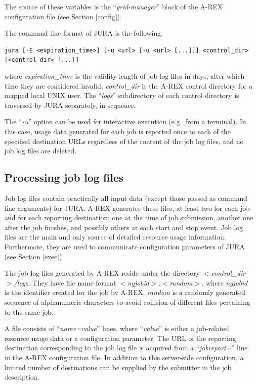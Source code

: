\documentclass{article}                            %
\begin{document}
The source of these variables is the ``\textit{grid-manager}'' block
of the A-REX configuration file (see Section \ref{config}).

The command line format of JURA is the following: %

\verb|jura [-E <expiration_time>] [-u <url> [-u <url> [...]]] <control_dir> [<control_dir> [...]]|

where \textit{expiration\_time} is the validity length of job log
files in days, after which time they are considered invalid;
\textit{control\_dir} is the A-REX control directory for a mapped
local UNIX user. The ``\textit{logs}'' subdirectory of each control
directory is traversed by JURA separately, in sequence.

The ``\textit{-u}'' option can be used for interactive execution
(e.g.~from a terminal). In this case, usage data generated for each
job is reported once to each of the specified destination URLs
regardless of the content of the job log files, and no job log files
are deleted.

\subsection{Processing job log files}
\label{joblogs}

Job log files contain practically all input data (except those passed
as command line arguments) for JURA. A-REX generates these files, at
least two for each job and for each reporting destination: one at the
time of job submission, another one after the job finishes, and
possibly others at each start and stop event. Job log files are the
main and only source of detailed resource usage information.
Furthermore, they are used to communicate configuration parameters of
JURA (see Section \ref{exec}).

The job log files generated by A-REX reside under the directory
\textit{$<$control\_dir$>$/logs}\cite{arex}. They have file name format
\textit{$<$ngjobid$>$.$<$random$>$}, where \textit{ngjobid} is the
identifier created for the job by A-REX, \textit{random} is a randomly
generated sequence of alphanumeric characters to avoid collision of
different files pertaining to the same job. 

A file consists of ``\textit{name=value}'' lines, where
``\textit{value}'' is either a job-related resource usage data or a
configuration parameter. The URL of the reporting destination
corresponding to the job log file is acquired from a
``\textit{jobreport=}'' line in the A-REX configuration file. In
addition to this server-side configuration, a limited number of
destinations can be supplied by the submitter in the job
description.
\end{document}
